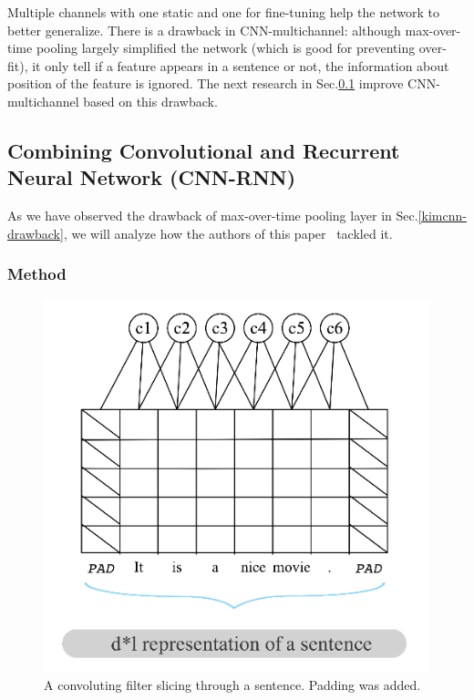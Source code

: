 Multiple channels with one static and one for fine-tuning help the network to better generalize.
There is a drawback in CNN-multichannel: although max-over-time pooling largely simplified the network (which is good for preventing over-fit), it only tell if a feature appears in a sentence or not, the information about position of the feature is ignored.\label{kim-drawback}
The next research in Sec.\ref{cnn-rnn}  improve CNN-multichannel based on this drawback.
 

\subsection{Combining Convolutional and Recurrent Neural Network (CNN-RNN)}\label{cnn-rnn}
As we have observed the drawback of max-over-time pooling layer in Sec.\ref{kimcnn-drawback}, we will analyze how the authors of this paper~\cite{cnn-rnn} tackled it.

\subsubsection{Method}
\begin{figure}[H]
    \centering
\includegraphics[scale=0.45]{figure/conv-word}
    \caption[Convolution with padding]{A convoluting filter slicing through a sentence. 
    Padding was added.}
    \label{fig:conv-word}
\end{figure}


